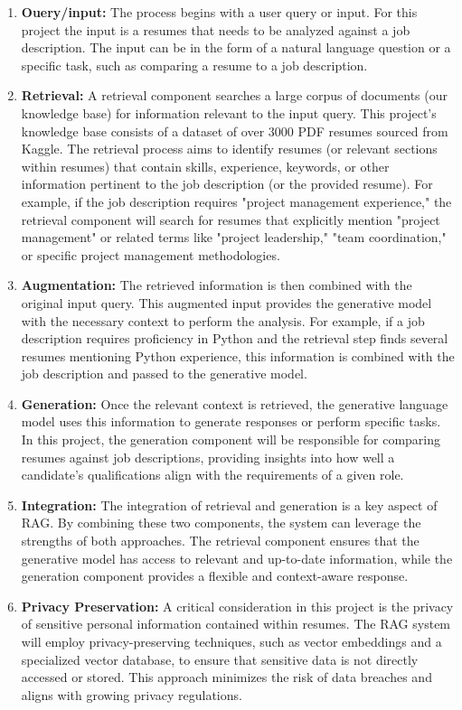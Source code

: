 \documentclass[12pt]{report}
\begin{document}
\begin{enumerate}
    \item \textbf{Ouery/input:} The process begins with a user query or input. For this project the input is a resumes that needs to be analyzed against a job description. The input can be in the form of a natural language question or a specific task, such as comparing a resume to a job description.
    \item \textbf{Retrieval:} A retrieval component searches a large corpus of documents (our knowledge base) for information relevant to the input query. This project’s knowledge base consists of a dataset of over 3000 PDF resumes sourced from Kaggle. The retrieval process aims to identify resumes (or relevant sections within resumes) that contain skills, experience, keywords, or other information pertinent to the job description (or the provided resume). For example, if the job description requires "project management experience," the retrieval component will search for resumes that explicitly mention "project management" or related terms like "project leadership," "team coordination," or specific project management methodologies.
    \item \textbf{Augmentation:} The retrieved information is then combined with the original input query. This augmented input provides the generative model with the necessary context to perform the analysis. For example, if a job description requires proficiency in Python and the retrieval step finds several resumes mentioning Python experience, this information is combined with the job description and passed to the generative model.
    \item \textbf{Generation:} Once the relevant context is retrieved, the generative language model uses this information to generate responses or perform specific tasks. In this project, the generation component will be responsible for comparing resumes against job descriptions, providing insights into how well a candidate's qualifications align with the requirements of a given role.
    \item \textbf{Integration:} The integration of retrieval and generation is a key aspect of RAG. By combining these two components, the system can leverage the strengths of both approaches. The retrieval component ensures that the generative model has access to relevant and up-to-date information, while the generation component provides a flexible and context-aware response. 
    \item \textbf{Privacy Preservation:} A critical consideration in this project is the privacy of sensitive personal information contained within resumes. The RAG system will employ privacy-preserving techniques, such as vector embeddings and a specialized vector database, to ensure that sensitive data is not directly accessed or stored. This approach minimizes the risk of data breaches and aligns with growing privacy regulations.
\end{enumerate}
\end{document}
